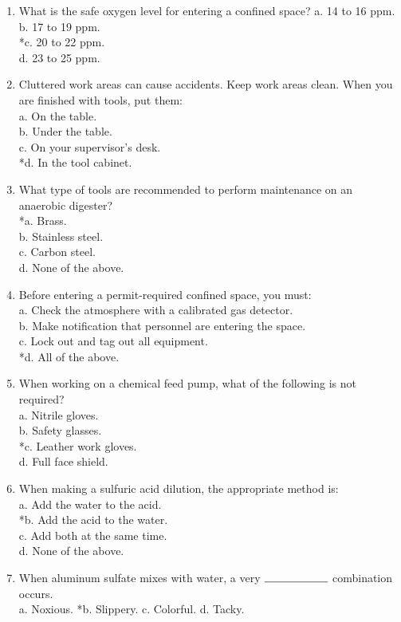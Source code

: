 \begin{enumerate}
\item What is the safe oxygen level for entering a confined space?
a.  14 to 16 ppm.\\
b.  17 to 19 ppm.\\
*c. 20 to 22 ppm.\\
d.  23 to 25 ppm.

\item Cluttered work areas can cause accidents. Keep work areas clean. When you are finished with tools, put them:\\
a.  On the table.\\
b.  Under the table.\\
c.  On your supervisor’s desk.\\
*d. In the tool cabinet.


\item What type of tools are recommended to perform maintenance on an anaerobic digester?\\
*a. Brass.\\
b.  Stainless steel.\\
c.  Carbon steel.\\
d.  None of the above.

\item Before entering a permit-required confined space, you must:\\
a.  Check the atmosphere with a calibrated gas detector.\\
b.  Make notification that personnel are entering the space.\\
c.  Lock out and tag out all equipment.\\
*d. All of the above.


\item When working on a chemical feed pump, what of the following is not required?\\
a.  Nitrile gloves.\\
b.  Safety glasses.\\
*c. Leather work gloves.\\
d.  Full face shield.

\item When making a sulfuric acid dilution, the appropriate method is:\\
a.  Add the water to the acid.\\
*b. Add the acid to the water.\\
c.  Add both at the same time.\\
d.  None of the above.


\item When aluminum sulfate mixes with water, a very $\rule{2cm}{0.15mm}$ combination occurs.\\
a.  Noxious.
*b. Slippery.
c.  Colorful.
d.  Tacky.



\end{enumerate}
